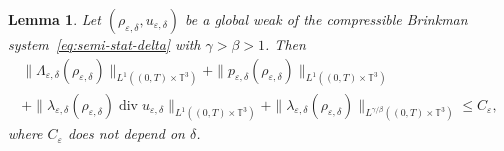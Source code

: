 \documentclass[JEP,XML,SOM,Unicode,NoEqCountersInSection]{cedram}
\newcommand{\<}{\bigl\langle}
\renewcommand{\>}{\bigr\rangle}
\newtheorem{lem}[thm]{Lemma}
\theoremstyle{definition}
\theoremstyle{remark}
\newcommand{\TT}{\mathbb{T}^3}
\DeclareMathOperator{\Div}{div}
\let\ep\varepsilon
\begin{document}
\begin{lem} Let $(\rho_{\varepsilon, \delta}, u_{\varepsilon,\delta})$ be a global weak
of the compressible Brinkman system~\eqref{eq:semi-stat-delta} with $\gamma > \beta > 1$. Then\vspace*{-3pt}
\begin{multline*}
\|\Lambda_{\varepsilon,\delta}(\rho_{\ep,\delta})\|_{L^1((0,T)\times \TT)} +
\|p_{\varepsilon,\delta}(\rho_{\ep,\delta})\|_{L^1((0,T)\times \TT)}\\
+
\|\lambda_{\varepsilon,\delta}(\rho_{\ep,\delta}) \Div u_{\varepsilon, \delta}\|_{L^1((0,T)\times \TT)}
+ \|\lambda_{\varepsilon,\delta}(\rho_{\varepsilon,\delta})\|_{L^{\gamma/\beta}((0,T)\times \TT)}
\le C_\varepsilon,
\end{multline*}
where $C_\varepsilon$ does not depend on $\delta$.
\end{lem}
\end{document}
